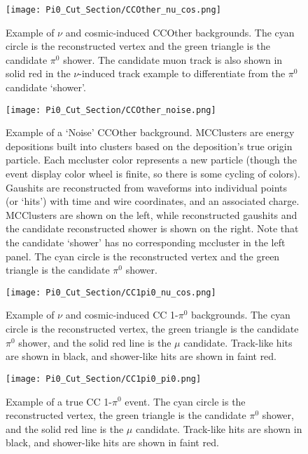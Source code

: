 \begin{figure}[h!]
\centering
\texttt{[image: Pi0\_Cut\_Section/CCOther\_nu\_cos.png]}
\hspace{1 mm}
\caption{ Example of $\nu$ and cosmic-induced CCOther backgrounds. The cyan circle is the reconstructed vertex and the green triangle is the candidate $\pi^0$ shower.  The candidate muon track is also shown in solid red in the $\nu$-induced track example to differentiate from the $\pi^0$ candidate `shower'.  }
\label{fig:ccoth_bkgd_nu_cos}
\end{figure}

\begin{figure}[h!]
\centering
\texttt{[image: Pi0\_Cut\_Section/CCOther\_noise.png]}
\caption{ Example of a `Noise' CCOther background. MCClusters are energy depositions built into clusters based on the deposition’s true origin particle. Each mccluster color represents a new particle (though the event display color wheel is finite, so there is some cycling of colors).  Gaushits are reconstructed from waveforms into individual points (or `hits') with time and wire coordinates, and an associated charge. MCClusters are shown on the left, while reconstructed gaushits and the candidate reconstructed shower is shown on the right.
 Note that the candidate `shower' has no corresponding mccluster in the left panel. The cyan circle is the reconstructed vertex and the green triangle is the candidate $\pi^0$ shower.  }
\label{fig:ccoth_bkgd_noise}
\end{figure}

\begin{figure}[h!]
\centering
\texttt{[image: Pi0\_Cut\_Section/CC1pi0\_nu\_cos.png]}
\caption{ Example of $\nu$ and cosmic-induced CC 1-$\pi^0$ backgrounds. The cyan circle is the reconstructed vertex, the green triangle is the candidate $\pi^0$ shower, and the solid red line is the $\mu$ candidate. Track-like hits are shown in black, and shower-like hits are shown in faint red. }
\label{fig:cc1pi0_nu_cos}
\end{figure}

\begin{figure}[h!]
\centering
\texttt{[image: Pi0\_Cut\_Section/CC1pi0\_pi0.png]}
\caption{ Example of a true CC 1-$\pi^0$ event. The cyan circle is the reconstructed vertex, the green triangle is the candidate $\pi^0$ shower, and the solid red line is the $\mu$ candidate. Track-like hits are shown in black, and shower-like hits are shown in faint red. }
\label{fig:cc1pi0_pi0}
\end{figure}



